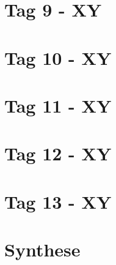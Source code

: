 \documentclass[
]{book}
\begin{document}
\hypertarget{tag-9---xy}{%
\chapter{Tag 9 - XY}\label{tag-9---xy}}

\hypertarget{tag-10---xy}{%
\chapter{Tag 10 - XY}\label{tag-10---xy}}

\hypertarget{tag-11---xy}{%
\chapter{Tag 11 - XY}\label{tag-11---xy}}

\hypertarget{tag-12---xy}{%
\chapter{Tag 12 - XY}\label{tag-12---xy}}

\hypertarget{tag-13---xy}{%
\chapter{Tag 13 - XY}\label{tag-13---xy}}

\hypertarget{synthese}{%
\chapter{Synthese}\label{synthese}}

  
\end{document}
